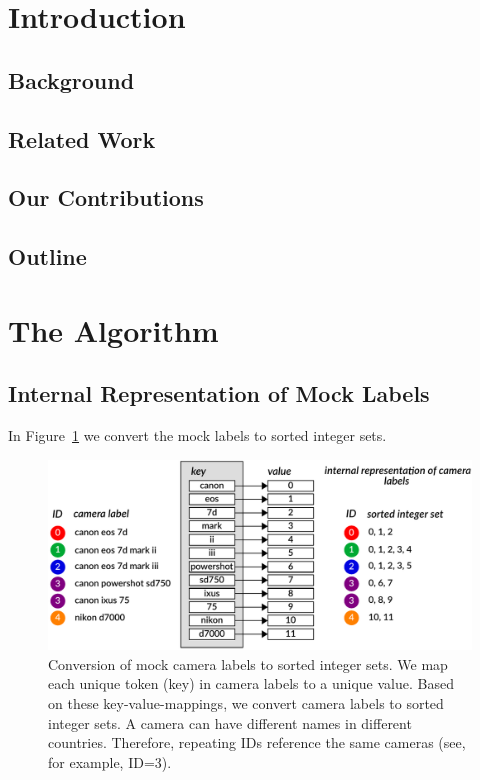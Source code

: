 \documentclass[sigconf]{acmart}
\begin{document}
\let\thefootnote\relax{}


\section{Introduction}


\subsection{Background}

\subsection{Related Work}

\subsection{Our Contributions}

\subsection{Outline}



\section{The Algorithm}

\subsection{Internal Representation of Mock Labels}
\label{sub:sec:internal}

In Figure~\ref{fig:integer:sets} we convert the mock labels to sorted integer sets.



\begin{figure}[htbp]
  \centering
  \includegraphics[width=\linewidth]{./graphics/integer_sets.pdf}
  \caption{Conversion of mock camera labels to sorted integer sets. 
We map each unique token (key) in camera labels to a unique value. 
Based on these key-value-mappings, we convert camera labels to sorted integer sets. 
A camera can have different names in different countries. Therefore, repeating IDs reference the same cameras (see, for example, ID=3).} 
  \label{fig:integer:sets}
\end{figure}
\end{document}
